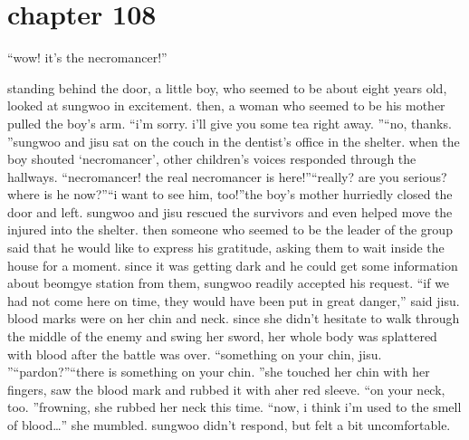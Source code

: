 \section{chapter 108}

                            “wow! it’s the necromancer!”




standing behind the door, a little boy, who seemed to be about eight years old, looked at sungwoo in excitement.
 then, a woman who seemed to be his mother pulled the boy’s arm.
“i’m sorry.
 i’ll give you some tea right away.
”“no, thanks.
”sungwoo and jisu sat on the couch in the dentist’s office in the shelter.
 when the boy shouted ‘necromancer’, other children’s voices responded through the hallways.
“necromancer! the real necromancer is here!”“really? are you serious? where is he now?”“i want to see him, too!”the boy’s mother hurriedly closed the door and left.
sungwoo and jisu rescued the survivors and even helped move the injured into the shelter.
then someone who seemed to be the leader of the group said that he would like to express his gratitude, asking them to wait inside the house for a moment.
 since it was getting dark and he could get some information about beomgye station from them, sungwoo readily accepted his request.
“if we had not come here on time, they would have been put in great danger,” said jisu.
blood marks were on her chin and neck.
 since she didn’t hesitate to walk through the middle of the enemy and swing her sword, her whole body was splattered with blood after the battle was over.
“something on your chin, jisu.
”“pardon?”“there is something on your chin.
”she touched her chin with her fingers, saw the blood mark and rubbed it with aher red sleeve.
“on your neck, too.
”frowning, she rubbed her neck this time.
“now, i think i’m used to the smell of blood…” she mumbled.
sungwoo didn’t respond, but felt a bit uncomfortable.


